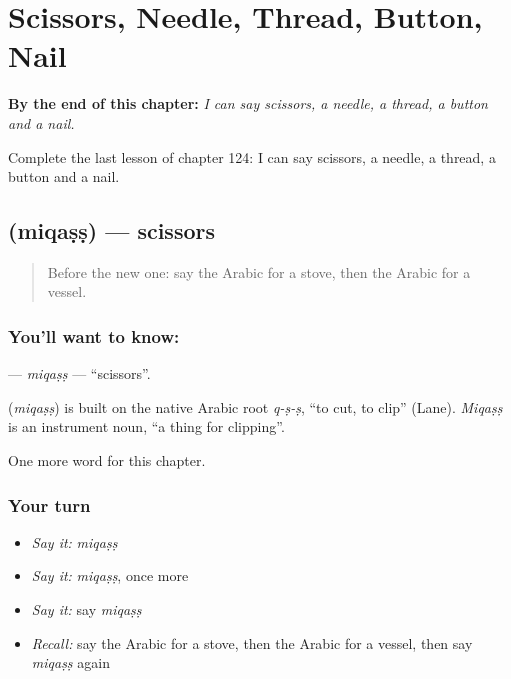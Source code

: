 
\chapter{Scissors, Needle, Thread, Button, Nail}
\label{ch:ar-scissors-needle-thread-button-nail}

\begin{chapteropening}
\textbf{By the end of this chapter:} \emph{I can say scissors, a needle, a thread, a button and a nail.}

Complete the last lesson of chapter 124: I can say scissors, a needle, a thread, a button and a nail.
\end{chapteropening}

\section[\texorpdfstring{\ar{مقص} (miqaṣṣ)}{مقص (miqaṣṣ)}]{ (miqaṣṣ) — scissors}

\label{lesson:AR-C124-miqass}



\begin{quote}
Before the new one: say the Arabic for a stove, then the Arabic for a vessel.
\end{quote}

\subsection*{You'll want to know: }
\textbf{} — \emph{miqaṣṣ} — \textquotedblleft{}scissors\textquotedblright{}.

\begin{cousinweb}
\textbf{} (\emph{miqaṣṣ}) is built on the native Arabic root \emph{q-ṣ-ṣ}, \textquotedblleft{}to cut, to clip\textquotedblright{} (Lane). \emph{Miqaṣṣ} is an instrument noun, \textquotedblleft{}a thing for clipping\textquotedblright{}.
\end{cousinweb}

\begin{grammarlens}[title={What you've built}]
One more word for this chapter.
\end{grammarlens}

\subsection*{Your turn}
\begin{itemize}
\raggedright
  \item \emph{Say it:} \emph{miqaṣṣ}
  \item \emph{Say it:} \emph{miqaṣṣ}, once more
  \item \emph{Say it:} say \emph{miqaṣṣ}
  \item \emph{Recall:} say the Arabic for a stove, then the Arabic for a vessel, then say \emph{miqaṣṣ} again
\end{itemize}

